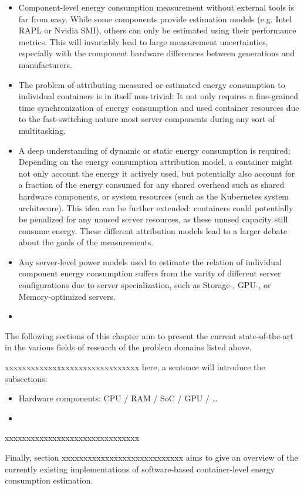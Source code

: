 \begin{itemize}
    \item Component-level energy consumption measurement without external tools is far from easy. While some components provide estimation models (e.g. Intel RAPL or Nvidia SMI), others can only be estimated using their performance metrics. This will invariably lead to large measurement uncertainties, especially with the component hardware differences between generations and manufacturers.
    \item The problem of attributing measured or estimated energy consumption to individual containers is in itself non-trivial: It not only requires a fine-grained time synchronization of energy consumption and used container resources due to the fast-switching nature most server components during any sort of multitasking.
    \item A deep understanding of dynamic or static energy consumption is required: Depending on the energy consumption attribution model, a container might not only account the energy it actively used, but potentially also account for a fraction of the energy consumed for any shared overhead such as shared hardware components, or system resources (such as the Kubernetes system architecure). This idea can be further extended: containers could potentially be penalized for any unused server resources, as these unused capacity still consume energy. These different attribution models lead to a larger debate about the goals of the measurements.
    \item Any server-level power models used to estimate the relation of individual component energy consumption suffers from the varity of different server configurations due to server specialization, such as Storage-, GPU-, or Memory-optimized servers.
    \item 
\end{itemize}

The following sections of this chapter aim to present the current state-of-the-art in the various fields of research of the problem domains listed above. 

xxxxxxxxxxxxxxxxxxxxxxxxxxxxxxx
here, a sentence will introduce the subsections:
\begin{itemize}
    \item Hardware components: CPU / RAM / SoC / GPU / \dots
    \item 
\end{itemize}
xxxxxxxxxxxxxxxxxxxxxxxxxxxxxxx

Finally, section xxxxxxxxxxxxxxxxxxxxxxxxxxxx aims to give an overview of the currently existing implementations of software-based container-level energy consumption estimation.

